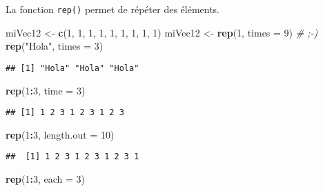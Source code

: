 \documentclass[]{book}
\newenvironment{Shaded}{\begin{snugshade}}{\end{snugshade}}
\newcommand{\KeywordTok}[1]{\textcolor[rgb]{0.13,0.29,0.53}{\textbf{#1}}}
\newcommand{\DataTypeTok}[1]{\textcolor[rgb]{0.13,0.29,0.53}{#1}}
\newcommand{\DecValTok}[1]{\textcolor[rgb]{0.00,0.00,0.81}{#1}}
\newcommand{\StringTok}[1]{\textcolor[rgb]{0.31,0.60,0.02}{#1}}
\newcommand{\CommentTok}[1]{\textcolor[rgb]{0.56,0.35,0.01}{\textit{#1}}}
\newcommand{\OperatorTok}[1]{\textcolor[rgb]{0.81,0.36,0.00}{\textbf{#1}}}
\newcommand{\NormalTok}[1]{#1}
\theoremstyle{definition}
\theoremstyle{definition}
\theoremstyle{definition}
\theoremstyle{remark}
\begin{document}
La fonction \texttt{rep()} permet de répéter des éléments.

\begin{Shaded}
\begin{Highlighting}[]
\NormalTok{miVec12 <-}\StringTok{ }\KeywordTok{c}\NormalTok{(}\DecValTok{1}\NormalTok{, }\DecValTok{1}\NormalTok{, }\DecValTok{1}\NormalTok{, }\DecValTok{1}\NormalTok{, }\DecValTok{1}\NormalTok{, }\DecValTok{1}\NormalTok{, }\DecValTok{1}\NormalTok{, }\DecValTok{1}\NormalTok{, }\DecValTok{1}\NormalTok{)}
\NormalTok{miVec12 <-}\StringTok{ }\KeywordTok{rep}\NormalTok{(}\DecValTok{1}\NormalTok{, }\DataTypeTok{times =} \DecValTok{9}\NormalTok{) }\CommentTok{# ;-)}
\KeywordTok{rep}\NormalTok{(}\StringTok{"Hola"}\NormalTok{, }\DataTypeTok{times =} \DecValTok{3}\NormalTok{)}
\end{Highlighting}
\end{Shaded}

\begin{verbatim}
## [1] "Hola" "Hola" "Hola"
\end{verbatim}

\begin{Shaded}
\begin{Highlighting}[]
\KeywordTok{rep}\NormalTok{(}\DecValTok{1}\OperatorTok{:}\DecValTok{3}\NormalTok{, }\DataTypeTok{time =} \DecValTok{3}\NormalTok{)}
\end{Highlighting}
\end{Shaded}

\begin{verbatim}
## [1] 1 2 3 1 2 3 1 2 3
\end{verbatim}

\begin{Shaded}
\begin{Highlighting}[]
\KeywordTok{rep}\NormalTok{(}\DecValTok{1}\OperatorTok{:}\DecValTok{3}\NormalTok{, }\DataTypeTok{length.out =} \DecValTok{10}\NormalTok{)}
\end{Highlighting}
\end{Shaded}

\begin{verbatim}
##  [1] 1 2 3 1 2 3 1 2 3 1
\end{verbatim}

\begin{Shaded}
\begin{Highlighting}[]
\KeywordTok{rep}\NormalTok{(}\DecValTok{1}\OperatorTok{:}\DecValTok{3}\NormalTok{, }\DataTypeTok{each =} \DecValTok{3}\NormalTok{)}
\end{Highlighting}
\end{Shaded}
\end{document}
